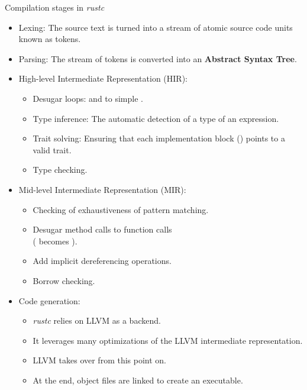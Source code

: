 \documentclass{beamer}
\begin{document}
\begin{frame}{Compilation stages in \emph{rustc}}
  \scriptsize

  \begin{itemize}
    \item Lexing: The source text is turned into a stream of atomic source code units known as tokens.
    \pause
    \item Parsing: The stream of tokens is converted into an \textbf{Abstract Syntax Tree}.
    \pause
    \item High-level Intermediate Representation (HIR):
    \begin{itemize}
      \scriptsize
      [circle]
      \item Desugar loops:  and  to simple .
      \item Type inference: The automatic detection of a type of an expression.
      \item Trait solving: Ensuring that each implementation block () points to a valid trait.
      \item Type checking.
    \end{itemize}
    \pause
    \item Mid-level Intermediate Representation (MIR): 
    \begin{itemize}
      \scriptsize
      [circle]
      \item Checking of exhaustiveness of pattern matching.
      \item Desugar method calls to function calls\\
                    ( becomes ).
      \item Add implicit dereferencing operations.
      \item Borrow checking.
    \end{itemize}
    \pause
    \item Code generation:
    \begin{itemize}
      \scriptsize
      [circle]
      \item \emph{rustc} relies on LLVM as a backend.
      \item It leverages many optimizations of the LLVM intermediate representation.
      \item LLVM takes over from this point on.
      \item At the end, object files are linked to create an executable.
    \end{itemize}
  \end{itemize}
\end{frame}
\end{document}
